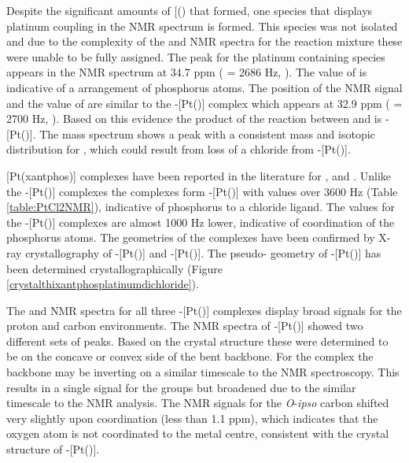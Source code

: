 Despite the significant amounts of [(\tBusixantphos{})\ce{H]+} that formed, one species that displays platinum coupling in the \phosphorus{} NMR spectrum is formed.  This species was not isolated and due to the complexity of the \proton{} and \carbon{} NMR spectra for the reaction mixture these were unable to be fully assigned.  The peak for the  platinum containing species appears in the \phosphorus{} NMR spectrum at 34.7 ppm (\JPtP{} = 2686 Hz, ).  The value of \JPtP{} is indicative of a \trans{} arrangement of phosphorus atoms.\cite{Rigamonti2010, Appleton1978, Pregosin1980}  The position of the \phosphorus{} NMR signal and the value of \JPtP{} are similar to the \trans-[Pt(\tButhixantphos)] complex which appears at 32.9 ppm (\JPtP{} = 2700 Hz, ).  Based on this evidence the product of the reaction between \tBusixantphos{} and  is \trans{}-[Pt(\tBusixantphos)].  The mass spectrum shows a peak with a consistent mass and isotopic distribution for , which could result from loss of a chloride from \trans-[Pt(\tBusixantphos)].\cite{Henderson1998}

[Pt(xantphos)] complexes have been reported in the literature for \Phsixantphos, \Phthixantphos{} and \Phxantphos{}.\cite{Kranenburg1998b}  Unlike the \trans-[Pt(\tBuxantphos)] complexes the \Phxantphos{} complexes form \cis{}-[Pt(\Phxantphos)] with \JPtP{} values over 3600 Hz (Table \ref{table:PtCl2NMR}), indicative of phosphorus \trans{} to a chloride ligand.  The \JPtP{} values for the \trans-[Pt(\tBuxantphos)] complexes are almost 1000 Hz lower, indicative of \trans{} coordination of the phosphorus atoms.  The \cis{} geometries of the \Phxantphos{} complexes have been confirmed by X-ray crystallography of \cis{}-[Pt(\Phsixantphos)]\cite{Duren2007} and \cis{}-[Pt(\Phxantphos)].\cite{Niksch2010}  The pseudo-\trans{} geometry of \trans-[Pt(\tButhixantphos)] has been determined crystallographically (Figure \ref{crystalthixantphosplatinumdichloride}). 

The \proton{} and \carbon{} NMR spectra for all three \trans-[Pt(\tBuxantphos)] complexes display broad signals for the \tBu{} proton and carbon environments.  The NMR spectra of \trans-[Pt(\tButhixantphos)] showed two different sets of \tBu{} peaks.  Based on the crystal structure these were determined to be on the concave or convex side of the bent backbone.  For the \tBuxantphos{} complex the backbone may be inverting on a similar timescale to the NMR spectroscopy.  This results in a single signal for the \tBu{} groups but broadened due to the similar timescale to the NMR analysis.  The \carbon{} NMR signals for the \emph{O}-\emph{ipso} carbon  shifted very slightly upon coordination (less than 1.1 ppm), which indicates that the oxygen atom is not coordinated to the metal centre, consistent with the crystal structure of \trans-[Pt(\tButhixantphos)].  


